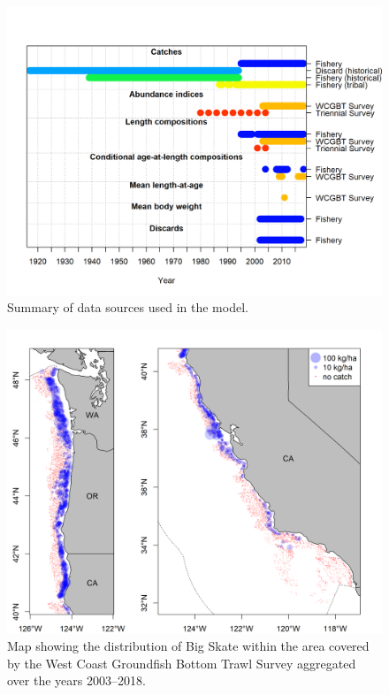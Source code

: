 \documentclass[12pt,]{article}
\begin{document}
\begin{figure}[!h]
\begin{centering}
\includegraphics{r4ss/plots_mod1/data_plot.png}
\caption{Summary of data sources used in the model.}\label{fig:data_plot}
\end{centering}
\end{figure}

\newpage

\FloatBarrier

\newpage

\begin{figure}[!h]
\begin{centering}
\includegraphics{Figures/survey_hauls_map.png}
\caption{Map showing the distribution of Big Skate within the area covered by the West Coast Groundfish Bottom Trawl Survey aggregated over the years 2003--2018.}\label{fig:survey_hauls_map}
\end{centering}
\end{figure}
\end{document}
